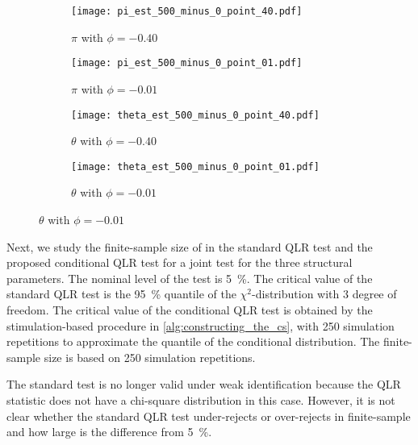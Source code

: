 \begin{figure}[htb]
  
  \caption[Parameter Estimates' \textit{t}-Statistics]{Parameter Estimates' $t$-Statistics}
  \label{fig:sim_parameter_estimates}


  \begin{subfigure}[t]{.48\textwidth}
    \caption[pi with phi = -0.40]{$\pi$ with $\phi = -0.40$}
    \texttt{[image: pi\_est\_500\_minus\_0\_point\_40.pdf]}
  \end{subfigure}
%
  \hfill
%
  \begin{subfigure}[t]{.48\textwidth}
    \caption[pi with phi = -0.01]{$\pi$ with $\phi = -0.01$}
    \texttt{[image: pi\_est\_500\_minus\_0\_point\_01.pdf]}
  \end{subfigure}
%
  \begin{subfigure}[b]{.48\textwidth}
    \caption[theta with phi = -0.40]{$\theta$ with $\phi = -0.40$}
    \texttt{[image: theta\_est\_500\_minus\_0\_point\_40.pdf]}
  \end{subfigure}
%
  \hfill
%
  \begin{subfigure}[b]{.48\textwidth}
    \caption[theta with phi = -0.01]{$\theta$ with $\phi = -0.01$}
    \texttt{[image: theta\_est\_500\_minus\_0\_point\_01.pdf]}
  \end{subfigure}
%
\end{figure}

Next, we study the finite-sample size of in the standard QLR test and the proposed conditional QLR test for a joint test for the three structural parameters. The nominal level of the test is \SI{5}{\percent}. The critical value of the standard QLR test is the \SI{95}{\percent} quantile of the $\chi^2$-distribution with $3$ degree of freedom. The critical value of the conditional QLR test is obtained by the stimulation-based procedure in \cref{alg:constructing_the_cs}, with \num{250} simulation repetitions to approximate the quantile of the conditional distribution. The finite-sample size is based on \num{250} simulation repetitions.

The standard test is no longer valid under weak identification because the QLR statistic does not have a chi-square distribution in this case. However, it is not clear whether the standard QLR test under-rejects or over-rejects in finite-sample and how large is the difference from \SI{5}{\percent}. 


